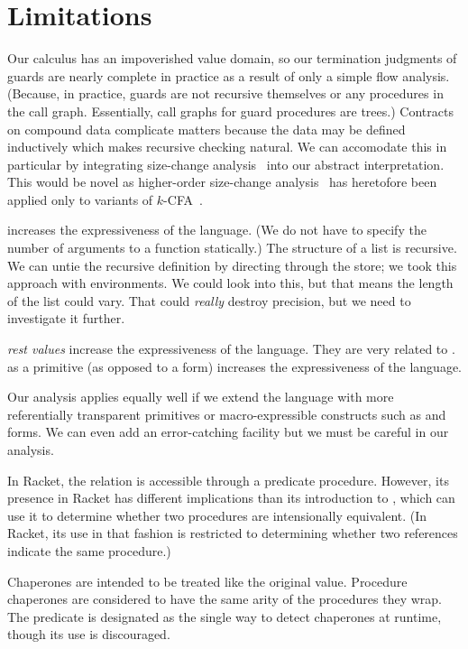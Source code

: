 \section{Limitations}
\label{sec:limitations}

Our calculus has an impoverished value domain, so our termination judgments of guards are nearly complete in practice as a result of only a simple flow analysis.
(Because, in practice, guards are not recursive themselves or any procedures in the call graph. Essentially, call graphs for guard procedures are trees.)
Contracts on compound data complicate matters because the data may be defined inductively which makes recursive checking natural.
We can accomodate this in particular by integrating size-change analysis~\cite{lee2001size} into our abstract interpretation.
This would be novel as higher-order size-change analysis~\cite{sereni2007termination} has heretofore been applied only to variants of $k$-CFA~\cite{shivers1991control}.

 increases the expressiveness of the language.
(We do not have to specify the number of arguments to a function statically.)
The structure of a list is recursive.
We can untie the recursive definition by directing through the store; we took this approach with environments.
We could look into this, but that means the length of the list could vary.
That could \emph{really} destroy precision, but we need to investigate it further.

\emph{rest values} increase the expressiveness of the language. They are very related to .
 as a primitive (as opposed to a form) increases the expressiveness of the language.

Our analysis applies equally well if we extend the language with more referentially transparent primitives or macro-expressible constructs such as  and  forms.
We can even add an error-catching facility but we must be careful in our analysis.

In Racket, the  relation is accessible through a predicate procedure.
However, its presence in Racket has different implications than its introduction to \chapcalc, which can use it to determine whether two procedures are intensionally equivalent.
(In Racket, its use in that fashion is restricted to determining whether two references indicate the same procedure.)

Chaperones are intended to be treated like the original value.
Procedure chaperones are considered to have the same arity of the procedures they wrap.
The  predicate is designated as the single way to detect chaperones at runtime, though its use is discouraged.

